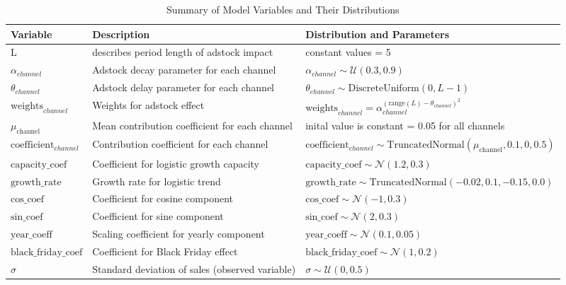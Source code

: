 \documentclass{article}
\begin{document}
\begin{table}[H]
    \small
    \centering
    \begin{tabular}{>{\raggedright}p{3cm} >{\raggedright}p{6cm} >{\raggedright\arraybackslash}p{6cm}}
        \toprule
        \textbf{Variable} & \textbf{Description} & \textbf{Distribution and Parameters} \\
        \midrule
        L & describes period length of adstock impact & constant values = 5 \\
        $\alpha_{channel}$ & Adstock decay parameter for each channel & $\alpha_{channel} \sim \mathcal{U}(0.3, 0.9)$ \\
        $\theta_{channel}$ & Adstock delay parameter for each channel & $\theta_{channel} \sim \text{DiscreteUniform}(0, L-1)$ \\
        $\text{weights}_{channel}$ & Weights for adstock effect & $\text{weights}_{channel} = \alpha_{channel}^{(\text{range}(L) - \theta_{channel})^2}$ \\
        $\mu_{\text{channel}}$ & Mean contribution coefficient for each channel & inital value is constant = 0.05 for all channels \\
        $\text{coefficient}_{channel}$ & Contribution coefficient for each channel & $\text{coefficient}_{channel} \sim \text{TruncatedNormal}(\mu_{\text{channel}}, 0.1, 0, 0.5)$ \\
        $\text{capacity\_coef}$ & Coefficient for logistic growth capacity & $\text{capacity\_coef} \sim \mathcal{N}(1.2, 0.3)$ \\
        $\text{growth\_rate}$ & Growth rate for logistic trend & $\text{growth\_rate} \sim \text{TruncatedNormal}(-0.02, 0.1, -0.15, 0.0)$ \\
        $\text{cos\_coef}$ & Coefficient for cosine component & $\text{cos\_coef} \sim \mathcal{N}(-1, 0.3)$ \\
        $\text{sin\_coef}$ & Coefficient for sine component & $\text{sin\_coef} \sim \mathcal{N}(2, 0.3)$ \\
        $\text{year\_coeff}$ & Scaling coefficient for yearly component & $\text{year\_coeff} \sim \mathcal{N}(0.1, 0.05)$ \\
        $\text{black\_friday\_coef}$ & Coefficient for Black Friday effect & $\text{black\_friday\_coef} \sim \mathcal{N}(1, 0.2)$ \\
        $\sigma$ & Standard deviation of sales (observed variable) & $\sigma \sim \mathcal{U}(0, 0.5)$ \\
        \bottomrule
    \end{tabular}
    \caption{Summary of Model Variables and Their Distributions}
    \label{tab:model_variables}
\end{table}
\end{document}
